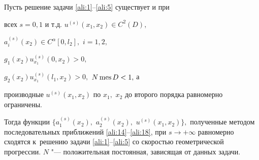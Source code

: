 \smallskip



\hypertarget{ali:thm2}{}



\begin{theorem}[2]Пусть решение задачи \eqref{ali:1}--\eqref{ali:5} существует и при 

всех $s=0, 1$  и т$.$д$.$ $u^{(s)}(x_1,x_2)\in C^2(D),$ 

$a_{i}^{(s)}(x_2)\in C^\alpha[0, l_2],$ $i=1, 2,$ 

${g_1(x_2)u_{x_1}^{(s)}(0,x_2)>0,}$ 

$g_2(x_2)u_{x_1}^{(s)}(l_1,x_2)>0,$ $N\mathop{\rm mes}D<1,$ а

производные $u^{(s)}(x_1,x_2)$ по $x_1,$ $x_2$ до второго порядка равномерно ограничены. 

Тогда функции $\{a_1^{(s)}(x_2),$ $a_2^{(s)}(x_2),$ $u^{(s)}(x_1,x_2)\},$ полученные методом последовательных приближений \eqref{ali:14}--\eqref{ali:18}{\rm ,} при $s\to+\infty$ равномерно сходятся к~решению задачи \eqref{ali:1}--\eqref{ali:5} со скоростью геометрической прогрессии$.$ $N$ "--- положительная постоянная{\rm ,} зависящая от данных задачи{\rm .}

\end{theorem}



\smallskip



